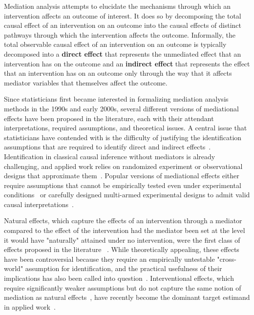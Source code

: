 \documentclass[11pt]{article} %
\numberwithin{equation}{section} %
\begin{document}
Mediation analysis attempts to elucidate the mechanisms through which an intervention affects an outcome of interest. It does so by decomposing the total causal effect of an intervention on an outcome into the causal effects of distinct pathways through which the intervention affects the outcome. Informally, the total observable causal effect of an intervention on an outcome is typically decomposed into a \textbf{direct effect} that represents the unmediated effect that an intervention has on the outcome and an \textbf{indirect effect} that represents the effect that an intervention has on an outcome only through the way that it affects mediator variables that themselves affect the outcome. 

Since statisticians first became interested in formalizing mediation analysis methods in the 1990s and early 2000s, several different versions of mediational effects have been proposed in the literature, each with their attendant interpretations, required assumptions, and theoretical issues. A central issue that statisticians have contended with is the difficulty of justifying the identification assumptions that are required to identify direct and indirect effects~\citep{vanderweele2015}. Identification in classical causal inference without mediators is already challenging, and applied work relies on randomized experiment or observational designs that approximate them~\citep{imbens2015}. Popular versions of mediational effects either require assumptions that cannot be empirically tested even under experimental conditions~\citep{imaietal2010} or carefully designed multi-armed experimental designs to admit valid causal interpretations~\citep{morenobetancur2018}. 

Natural effects, which capture the effects of an intervention through a mediator compared to the effect of the intervention had the mediator been set at the level it would have "naturally" attained under no intervention, were the first class of effects proposed in the literature ~\citep{robinsgreenland1992, pearl2001, avinetal2005}. While theoretically appealing, these effects have been controversial because they require an empirically untestable "cross-world" assumption for identification, and the practical usefulness of their implications has also been called into question~\citep{vanderweelevansteelandt2009, imaietal2010}. Interventional effects, which require significantly weaker assumptions but do not capture the same notion of mediation as natural effects~\citep{miles2023}, have recently become the dominant target estimand in applied work~\citep{vanderweeleetal2014, vanderweele2015, vansteelandtdaniel2017}. 
\end{document}

